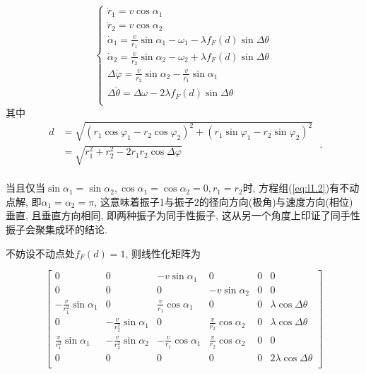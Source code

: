 \documentclass{article}
\begin{document}
\begin{equation}\label{eq:l1.2}
	\begin{cases}
        \dot{r}_1=v\cos \alpha _1\\
        \dot{r}_2=v\cos \alpha _2\\
        \dot{\alpha}_1=\frac{v}{r_1}\sin \alpha _1-\omega _1-\lambda f_F\left( d \right) \sin \Delta \theta\\
        \dot{\alpha}_2=\frac{v}{r_2}\sin \alpha _2-\omega _2+\lambda f_F\left( d \right) \sin \Delta \theta\\
        \Delta \dot{\varphi}=\frac{v}{r_2}\sin \alpha _2-\frac{v}{r_1}\sin \alpha _1\\
        \Delta \dot{\theta}=\Delta \omega -2\lambda f_F\left( d \right) \sin \Delta \theta\\
    \end{cases}
\end{equation}
其中
$$
\begin{aligned}
	d&=\sqrt{\left( r_1\cos \varphi _1-r_2\cos \varphi _2 \right) ^2+\left( r_1\sin \varphi _1-r_2\sin \varphi _2 \right) ^2}\\
	&=\sqrt{r_{1}^{2}+r_{2}^{2}-2r_1r_2\cos \Delta \varphi}\\
\end{aligned}\;.
$$

当且仅当$\sin \alpha _1=\sin \alpha _2, \cos \alpha _1=\cos \alpha _2=0, r_1=r_2$时, 方程组(\ref{eq:l1.2})有不动点解, 即$\alpha _1=\alpha _2=\pi$, 这意味着振子1与振子2的径向方向(极角)与速度方向(相位)垂直, 且垂直方向相同, 即两种振子为同手性振子, 这从另一个角度上印证了同手性振子会聚集成环的结论. 

不妨设不动点处$f_F\left( d \right)=1$, 则线性化矩阵为

$$
\left[ \begin{matrix}
	0&		0&		-v\sin \alpha _1&		0&		0&		0\\
	0&		0&		0&		-v\sin \alpha _2&		0&		0\\
	-\frac{v}{r_{1}^{2}}\sin \alpha _1&		0&		\frac{v}{r_1}\cos \alpha _1&		0&		0&		\lambda \cos \Delta \theta\\
	0&		-\frac{v}{r_{2}^{2}}\sin \alpha _1&		0&		\frac{v}{r_2}\cos \alpha _2&		0&		\lambda \cos \Delta \theta\\
	\frac{v}{r_{1}^{2}}\sin \alpha _1&		-\frac{v}{r_{2}^{2}}\sin \alpha _2&		-\frac{v}{r_1}\cos \alpha _1&		\frac{v}{r_2}\cos \alpha _2&		0&		0\\
	0&		0&		0&		0&		0&		2\lambda \cos \Delta \theta\\
\end{matrix} \right] 
$$
\end{document}
